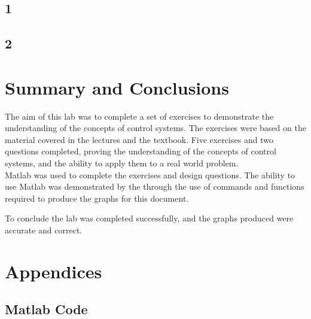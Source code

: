 \documentclass[12pt]{article}
\begin{document}
\subsection{1}
\label{sec:Q4_1}
\subsection{2}
\label{sec:Q4_2}
\pagebreak

\section{Summary and Conclusions}\label{sec:summary}

The aim of this lab was to complete a set of exercises to demonstrate the understanding of the concepts of control systems. The exercises were based on the material covered in the lectures and the textbook. Five exercises and two questions completed, proving the understanding of the concepts of control systems, and the ability to apply them to a real world problem.\\

Matlab was used to complete the exercises and design questions. The ability to use Matlab was demonstrated by the through the use of commands and functions required to produce the graphs for this document.

To conclude the lab was completed successfully, and the graphs produced were accurate and correct.\\


\pagebreak

%
%


\appendix
\section*{Appendices}\label{appendix:main}
\renewcommand{\thesubsection}{\Alph{subsection}}

\subsection{Matlab Code}
\end{document}
